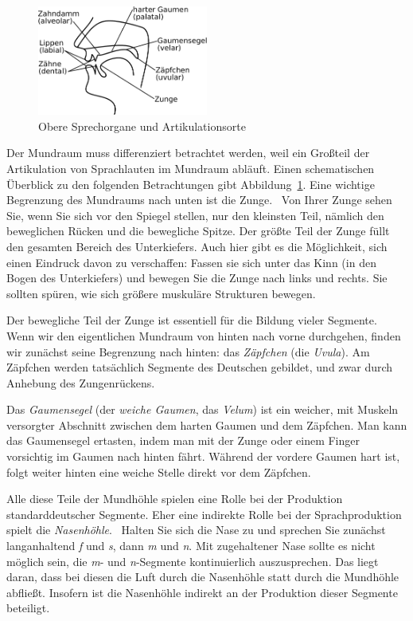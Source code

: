 \begin{figure}
  \centering
  \includegraphics[width=0.5\textwidth]{figures/mundraum}
  \caption[Obere Sprechorgane und Artikulationsorte]{Obere Sprechorgane und Artikulationsorte}
  \label{fig:oberesprechorgane}
\end{figure}

Der Mundraum muss differenziert betrachtet werden, weil ein Großteil der Artikulation von Sprachlauten im Mundraum abläuft.
Einen schematischen Überblick zu den folgenden Betrachtungen gibt Abbildung~\ref{fig:oberesprechorgane}.
Eine wichtige Begrenzung des Mundraums nach unten ist die Zunge.
\TuBegin~Von Ihrer Zunge sehen Sie, wenn Sie sich vor den Spiegel stellen, nur den kleinsten Teil, nämlich den beweglichen Rücken und die bewegliche Spitze.
Der größte Teil der Zunge füllt den gesamten Bereich des Unterkiefers.
Auch hier gibt es die Möglichkeit, sich einen Eindruck davon zu verschaffen:
Fassen sie sich unter das Kinn (in den Bogen des Unterkiefers) und bewegen Sie die Zunge nach links und rechts.
Sie sollten spüren, wie sich größere muskuläre Strukturen bewegen.

Der bewegliche Teil der Zunge ist essentiell für die Bildung vieler Segmente.
Wenn wir den eigentlichen Mundraum von hinten nach vorne durchgehen, finden wir zunächst seine Begrenzung nach hinten: das \textit{Zäpfchen} (die \textit{Uvula}).
Am Zäpfchen werden tatsächlich Segmente des Deutschen gebildet, und zwar durch Anhebung des Zungenrückens.

Das \textit{Gaumensegel} (der \textit{weiche Gaumen}, das \textit{Velum}) ist ein weicher, mit Muskeln versorgter Abschnitt zwischen dem harten Gaumen und dem Zäpfchen.
Man kann das Gaumensegel ertasten, indem man mit der Zunge oder einem Finger vorsichtig im Gaumen nach hinten fährt.
Während der vordere Gaumen hart ist, folgt weiter hinten eine weiche Stelle direkt vor dem Zäpfchen.

Alle diese Teile der Mundhöhle spielen eine Rolle bei der Produktion standarddeutscher Segmente.
Eher eine indirekte Rolle bei der Sprachproduktion spielt die \textit{Nasenhöhle}.
\TuBegin~Halten Sie sich die Nase zu und sprechen Sie zunächst langanhaltend \textit{f} und \textit{s}, dann \textit{m} und \textit{n}.
Mit zugehaltener Nase sollte es nicht möglich sein, die \textit{m}- und \textit{n}-Segmente kontinuierlich auszusprechen.
Das liegt daran, dass bei diesen die Luft durch die Nasenhöhle statt durch die Mundhöhle abfließt.
Insofern ist die Nasenhöhle indirekt an der Produktion dieser Segmente beteiligt.

